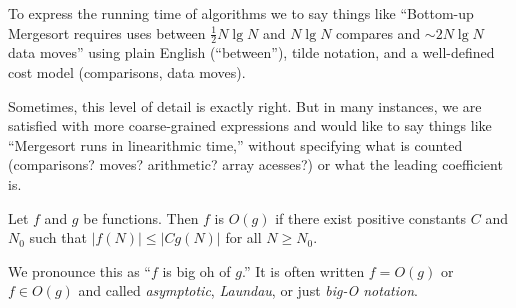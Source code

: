\documentclass{tufte-handout}
\begin{document}
To express the running time of algorithms we to say things like
``Bottom-up Mergesort requires uses between $\frac{1}{2}N\lg N$ and
$N\lg N$ compares and $\sim 2N\lg N$ data moves'' using plain English
(``between''), tilde notation, and a well-defined cost model
(comparisons, data moves).

Sometimes, this level of detail is exactly right.
But in many instances, we are satisfied with more coarse-grained
expressions and  would like to say things like
``Mergesort runs in linearithmic time,'' without specifying what is
counted (comparisons? moves? arithmetic? array acesses?) or what the
leading coefficient is.

Let $f$ and $g$ be functions. Then $f$ is $O(g)$ if there exist
positive constants $C$ and $N_0$ such that
$|f(N)|\leq  |Cg(N)|$ for all $N\geq N_0$.

We pronounce this as ``$f$ is big oh of $g$.''
It is often written $f=O(g)$ or $f\in O(g)$ and called 
\emph{asymptotic}, \emph{Laundau}, or just \emph{big-O notation}.
\end{document}

